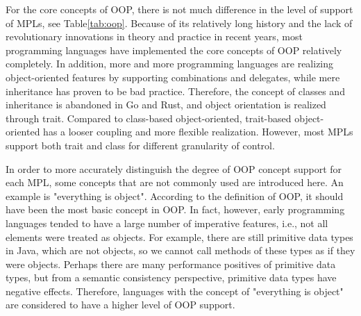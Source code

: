 For the core concepts of OOP, there is not much difference in the level of support of MPLs, see Table\ref{tab:oop}.
Because of its relatively long history and the lack of revolutionary innovations in theory and practice in recent years, most programming languages have implemented the core concepts of OOP relatively completely. In addition, more and more programming languages are realizing object-oriented features by supporting combinations and delegates, while mere inheritance has proven to be bad practice. Therefore, the concept of classes and inheritance is abandoned in Go and Rust, and object orientation is realized through trait. Compared to class-based object-oriented, trait-based object-oriented has a looser coupling and more flexible realization. However, most MPLs support both trait and class for different granularity of control.

In order to more accurately distinguish the degree of OOP concept support for each MPL, some concepts that are not commonly used are introduced here. An example is "everything is object". According to the definition of OOP, it should have been the most basic concept in OOP. In fact, however, early programming languages tended to have a large number of imperative features, i.e., not all elements were treated as objects. For example, there are still primitive data types in Java, which are not objects, so we cannot call methods of these types as if they were objects. Perhaps there are many performance positives of primitive data types, but from a semantic consistency perspective, primitive data types have negative effects. Therefore, languages with the concept of "everything is object" are considered to have a higher level of OOP support.

